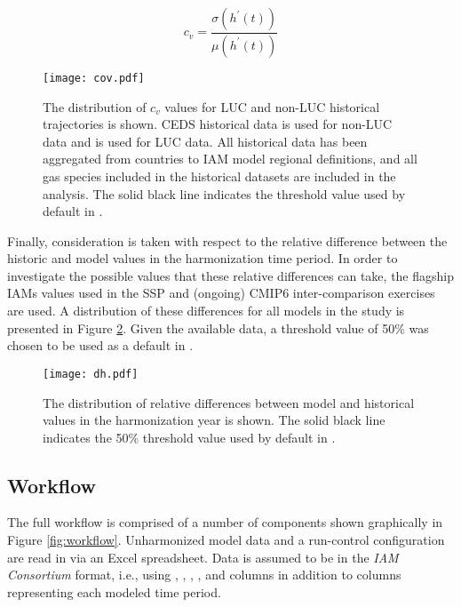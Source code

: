 \begin{equation}\label{eqs:cov}
    c_v =  \frac{\sigma(h^{\prime}(t))}{\mu(h^{\prime}(t))}
\end{equation}


\begin{figure}
  \begin{center}
    \texttt{[image: cov.pdf]}
    \caption[]{
      \label{fig:cov}
      The distribution of $c_v$ values for LUC and non-LUC historical
      trajectories is shown. CEDS historical data \cite{hoesly_historical_2017}
      is used for non-LUC data and \cite{van_marle_historic_2017} is used for
      LUC data. All historical data has been aggregated from countries to IAM
      model regional definitions, and all gas species included in the historical
      datasets are included in the analysis. The solid black line indicates the
      threshold value used by default in .  }
  \end{center}
\end{figure}

Finally, consideration is taken with respect to the relative difference between
the historic and model values in the harmonization time period. In order to
investigate the possible values that these relative differences can take, the
flagship IAMs values used in the SSP and (ongoing) CMIP6 inter-comparison
exercises are used. A distribution of these differences for all models in the
study is presented in Figure \ref{fig:dh}. Given the available data, a threshold
value of 50\% was chosen to be used as a default in .

\begin{figure}
  \begin{center}
    \texttt{[image: dh.pdf]}
    \caption[]{
      \label{fig:dh}
      The distribution of relative differences between model and historical
      values in the harmonization year is shown. The solid black line indicates
      the 50\% threshold value used by default in .  
    }
  \end{center}
\end{figure}

\subsection{ Workflow}\label{sec:workflow}

The full  workflow is comprised of a number of components shown
graphically in Figure \ref{fig:workflow}. Unharmonized model data and a
run-control configuration are read in via an Excel spreadsheet. Data is assumed
to be in the \textit{IAM Consortium} format, i.e., using ,
, , , and  columns in
addition to columns representing each modeled time period. 

